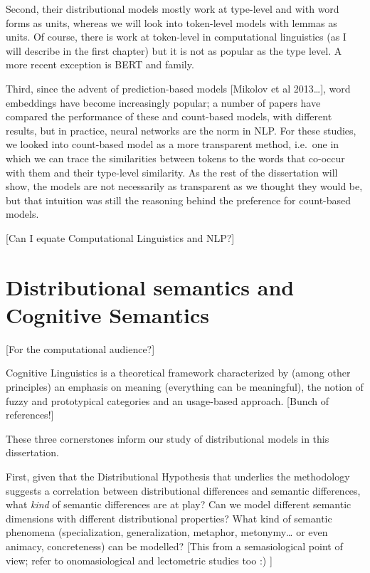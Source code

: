\documentclass[
]{book}
\begin{document}
Second, their distributional models mostly work at type-level and with word forms as units,
whereas we will look into token-level models with lemmas as units.
Of course, there is work at token-level in computational linguistics (as I will describe in the first chapter)
but it is not as popular as the type level. A more recent exception is BERT and family.

Third, since the advent of prediction-based models {[}Mikolov et al 2013\ldots{]}, word embeddings have become
increasingly popular; a number of papers have compared the performance of these and count-based models,
with different results, but in practice, neural networks are the norm in NLP. For these studies, we
looked into count-based model as a more transparent method, i.e.~one in which we can trace the similarities
between tokens to the words that co-occur with them and their type-level similarity.
As the rest of the dissertation will show, the models are not necessarily as transparent as we thought they would be,
but that intuition was still the reasoning behind the preference for count-based models.

{[}Can I equate Computational Linguistics and NLP?{]}

\hypertarget{cog}{%
\section{Distributional semantics and Cognitive Semantics}\label{cog}}

{[}For the computational audience?{]}

Cognitive Linguistics is a theoretical framework characterized by (among other principles) an emphasis on meaning
(everything can be meaningful), the notion of fuzzy and prototypical categories and an usage-based approach.
{[}Bunch of references!{]}

These three cornerstones inform our study of distributional models in this dissertation.

First, given that the Distributional Hypothesis that underlies the methodology suggests a correlation between
distributional differences and semantic differences, what \emph{kind} of semantic differences are at play?
Can we model different semantic dimensions with different distributional properties?
What kind of semantic phenomena (specialization, generalization, metaphor, metonymy\ldots{} or even animacy, concreteness) can be modelled?
{[}This from a semasiological point of view; refer to onomasiological and lectometric studies too :) {]}
\end{document}
